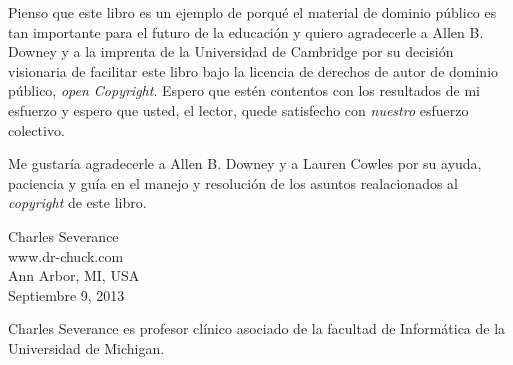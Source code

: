 Pienso que este libro es un ejemplo de porqu\'e el material de dominio p\'ublico es tan importante para el futuro de la educaci\'on y quiero agradecerle a Allen B. Downey y a la imprenta de la Universidad de Cambridge por su decisi\'on visionaria de facilitar este libro bajo la licencia de derechos de autor de dominio p\'ublico, \textit{open Copyright}. Espero que est\'en contentos con los resultados de mi esfuerzo y espero que usted, el lector, quede satisfecho con \emph{nuestro} esfuerzo colectivo.

Me gustar\'ia agradecerle a Allen B. Downey y a Lauren Cowles por su ayuda,
paciencia y gu\'ia en el manejo y resoluci\'on de los asuntos realacionados al \textit{copyright} de este libro.

Charles Severance\\
www.dr-chuck.com\\
Ann Arbor, MI, USA\\
Septiembre 9, 2013

Charles Severance es profesor cl\'inico asociado de la facultad de Inform\'atica de la Universidad de Michigan.

\clearemptydoublepage

\begin{latexonly}

\tableofcontents

\clearemptydoublepage

\end{latexonly}

\mainmatter


